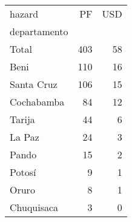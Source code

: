 \begin{tabular}{lrr}
\toprule
hazard &   PF &  USD \\
departamento &      &      \\
\midrule
Total        &  403 &   58 \\
Beni         &  110 &   16 \\
Santa Cruz   &  106 &   15 \\
Cochabamba   &   84 &   12 \\
Tarija       &   44 &    6 \\
La Paz       &   24 &    3 \\
Pando        &   15 &    2 \\
Potosí       &    9 &    1 \\
Oruro        &    8 &    1 \\
Chuquisaca   &    3 &    0 \\
\bottomrule
\end{tabular}
